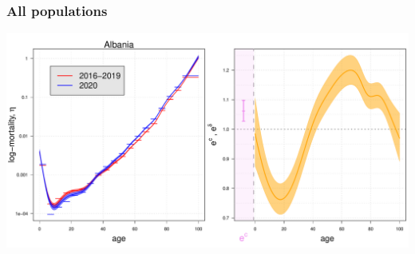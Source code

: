 \documentclass[table,xcdraw,dvipsnames]{beamer}
\begin{document}
\begin{frame}[fragile]\frametitle{All populations}
	\begin{center}
		\includegraphics[scale=.26, page=67]{Figures/All.pdf}
	\end{center}
\end{frame}
\end{document}
